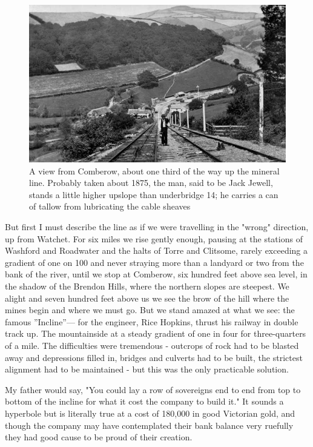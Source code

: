 \begin{figure}
	 \centering
     \includegraphics[width=1\textwidth]{figures/inclineTop}
     \caption{A view from Comberow, about one third of the way up the mineral line. Probably taken about 1875, the man, said to be Jack Jewell, stands a little higher upslope than underbridge 14; he carries a can of tallow from lubricating the cable sheaves}
     \label{fig:inclineTop}
\end{figure}

But first I must describe the line as if we were travelling in the "wrong" direction, up from Watchet. For six miles we rise gently enough, pausing at the stations of Washford and Roadwater and the halts of Torre and Clitsome, rarely exceeding a gradient of one on 100 and never straying more than a landyard or two from the bank of the river, until we stop at Comberow, six hundred feet above sea level, in the shadow of the Brendon Hills, where the northern slopes are steepest. We alight and seven hundred feet above us we see the brow of the hill where the mines begin and where we must go. But we stand amazed at what we see: the famous ''Incline”— for the engineer, Rice Hopkins, thrust his railway in double track up. The mountainside at a steady gradient of one in four for three-quarters of a mile. The difficulties were tremendous - outcrops of rock had to be blasted away and depressions filled in, bridges and culverts had to be built, the strictest alignment had to be maintained - but this was the only practicable solution.

My father would say, "You could lay a row of sovereigns end to end from top to bottom of the incline for what it cost the company to build it." It sounds a hyperbole but is literally true at a cost of 180,000 in good Victorian gold, and though the company may have contemplated their bank balance very ruefully they had good cause to be proud of their creation.


